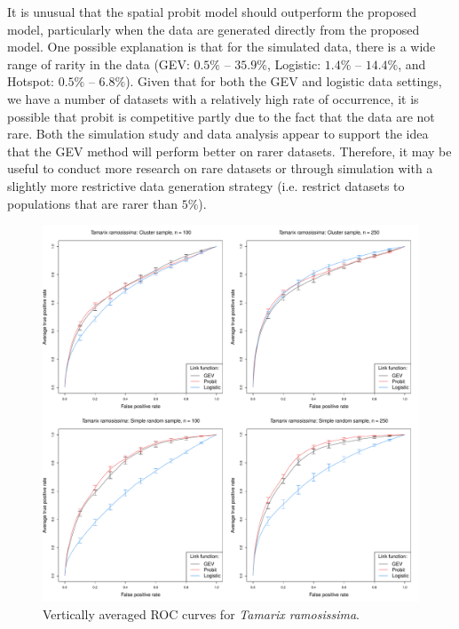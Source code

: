 It is unusual that the spatial probit model should outperform the proposed model, particularly when the data are generated directly from the proposed model.
One possible explanation is that for the simulated data, there is a wide range of rarity in the data (GEV: $0.5\%$ -- $35.9\%$, Logistic: $1.4\%$ -- $14.4\%$, and Hotspot: $0.5\%$ -- $6.8\%$).
Given that for both the GEV and logistic data settings, we have a number of datasets with a relatively high rate of occurrence, it is possible that probit is competitive partly due to the fact that the data are not rare.
Both the simulation study and data analysis appear to support the idea that the GEV method will perform better on rarer datasets.
Therefore, it may be useful to conduct more research on rare datasets or through simulation with a slightly more restrictive data generation strategy (i.e. restrict datasets to populations that are rarer than $5\%$).

\begin{figure}
	\includegraphics[width=\linewidth]{plots/data-perf-species1}
	\caption{Vertically averaged ROC curves for \emph{Tamarix ramosissima}.}
	\label{rbfig:data1roc}
\end{figure}

